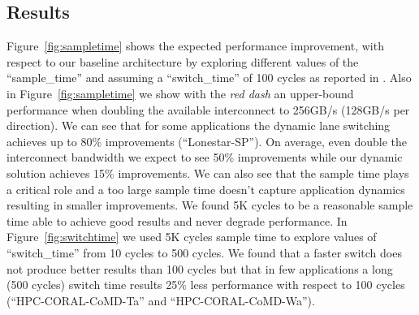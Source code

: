\subsection{Results}
Figure~\ref{fig:sampletime} shows the expected performance improvement, with 
respect to our baseline architecture by exploring different values 
of the ``sample\_time'' and assuming a ``switch\_time'' of 100 cycles 
as reported in \cite{REALLY_NEED_REF_HERE}. Also in Figure~\ref{fig:sampletime}
we show with the \emph{red dash} an upper-bound performance when doubling
the available interconnect to 256GB/s (128GB/s per direction). 
We can see that for some applications the dynamic lane switching achieves up to
80\% improvements (``Lonestar-SP''). On average, even double the interconnect 
bandwidth we expect to see 50\% improvements while our dynamic solution 
achieves 15\% improvements. We can also see that the sample time plays a 
critical role and a too large sample time doesn't capture application dynamics 
resulting in smaller improvements. We found 5K cycles to be a reasonable sample
time able to achieve good results and never degrade performance. 
In Figure~\ref{fig:switchtime} we used 5K cycles sample time to
explore values of ``switch\_time'' from 10 cycles to 500 cycles.
We found that a faster switch does not produce better results than 100 cycles
but that in few applications a long (500 cycles) switch time results 25\% 
less performance with respect to 100 cycles (``HPC-CORAL-CoMD-Ta'' and 
``HPC-CORAL-CoMD-Wa'').






